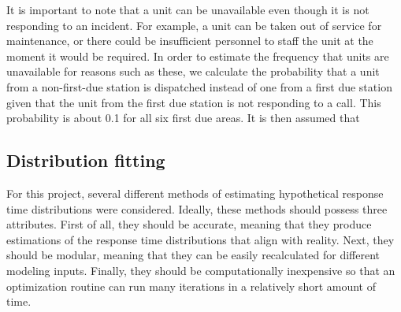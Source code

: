 \documentclass[article]{proc}
\begin{document}
It is important to note that a unit can be unavailable even though it is not responding to an incident. For example, a unit can be taken out of service for maintenance, or there could be insufficient personnel to staff the unit at the moment it would be required. In order to estimate the frequency that units are unavailable for reasons such as these, we calculate the probability that a unit from a non-first-due station is dispatched instead of one from a first due station given that the unit from the first due station is not responding to a call. This probability is about 0.1 for all six first due areas. It is then assumed that






\subsection{Distribution fitting}
For this project, several different methods of estimating hypothetical response time distributions were considered. Ideally, these methods should possess three attributes. First of all, they should be accurate, meaning that they produce estimations of the response time distributions that align with reality. Next, they should be modular, meaning that they can be easily recalculated for different modeling inputs. Finally, they should be computationally inexpensive so that an optimization routine can run many iterations in a relatively short amount of time. 
\end{document}
